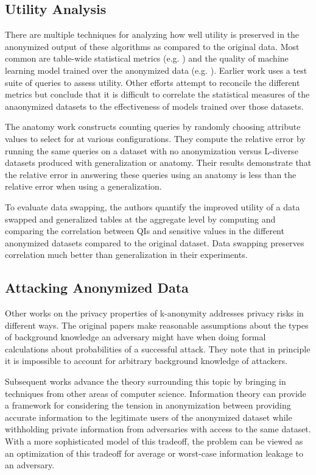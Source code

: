 \subsection{Utility Analysis}
There are multiple techniques for analyzing how well utility is preserved in the anonymized output of these algorithms as compared to the original data. Most common are table-wide statistical metrics (e.g. \cite{soriaSwapping}) and the quality of machine learning model trained over the anonymized data (e.g. \cite{sangogboyePad}). Earlier work\cite{xiaoAnatomy} uses a test suite of queries to assess utility. Other efforts attempt to reconcile the different metrics but conclude that it is difficult to correlate the statistical measures of the anaonymized datasets to the effectiveness of models trained over those datasets\cite{vsarvcevicEffectiveness}.

The anatomy work\cite{xiaoAnatomy} constructs counting queries by randomly choosing attribute values to select for at various configurations. They compute the relative error by running the same queries on a dataset with no anonymization versus L-diverse datasets produced with generalization or anatomy. Their results demonstrate that the relative error in answering these queries using an anatomy is less than the relative error when using a generalization.

To evaluate data swapping\cite{soriaSwapping}, the authors quantify the improved utility of a data swapped and generalized tables at the aggregate level by computing and comparing the correlation between QIs and sensitive values in the different anonymized datasets compared to the original dataset. Data swapping preserves correlation much better than generalization in their experiments.

\subsection{Attacking Anonymized Data}
Other works on the privacy properties of k-anonymity addresses privacy risks in different ways. The original papers make reasonable assumptions about the types of background knowledge an adversary might have when doing formal calculations about probabilities of a successful attack. They note that in principle it is impossible to account for arbitrary background knowledge of attackers.

Subsequent works advance the theory surrounding this topic by bringing in techniques from other areas of computer science. Information theory can provide a framework for considering the tension in anonymization between providing accurate information to the legitimate users of the anonymized dataset while withholding private information from adversaries with access to the same dataset\cite{liuInfoTheory}. With a more sophisticated model of this tradeoff, the problem can be viewed as an optimization of this tradeoff for average or worst-case information leakage to an adversary\cite{duInfoTheory}.

